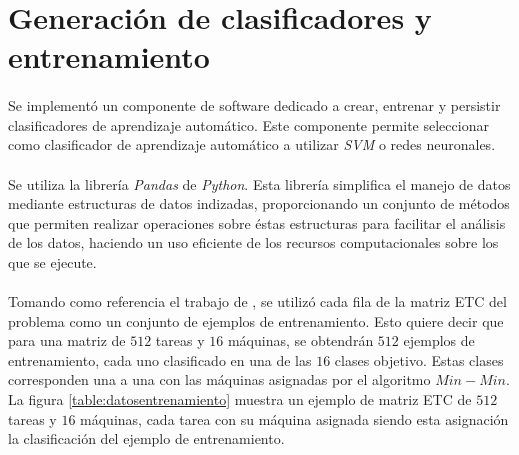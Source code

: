 \section{Generación de clasificadores y entrenamiento}

\paragraph{} Se implementó un componente de software dedicado a crear, entrenar y persistir clasificadores de aprendizaje automático. Este componente permite seleccionar como clasificador de aprendizaje automático a utilizar \textit{SVM} o redes neuronales.

\paragraph{} Se utiliza la librería \textit{Pandas}\cite{bib-pandas} de \textit{Python}. Esta librería simplifica el manejo de datos mediante estructuras de datos indizadas, proporcionando un conjunto de métodos que permiten realizar operaciones sobre éstas estructuras para facilitar el análisis de los datos, haciendo un uso eficiente de los recursos computacionales sobre los que se ejecute.

\paragraph{} Tomando como referencia el trabajo de \citet{savant-original}, se utilizó cada fila de la matriz ETC del problema como un conjunto de ejemplos de entrenamiento. Esto quiere decir que para una matriz de $512$ tareas y $16$ máquinas, se obtendrán $512$ ejemplos de entrenamiento, cada uno clasificado en una de las $16$ clases objetivo. Estas clases corresponden una a una con las máquinas asignadas por el algoritmo $Min-Min$. La figura \ref{table:datosentrenamiento} muestra un ejemplo de matriz ETC de $512$ tareas y $16$ máquinas, cada tarea con su máquina asignada siendo esta asignación la clasificación del ejemplo de entrenamiento.



